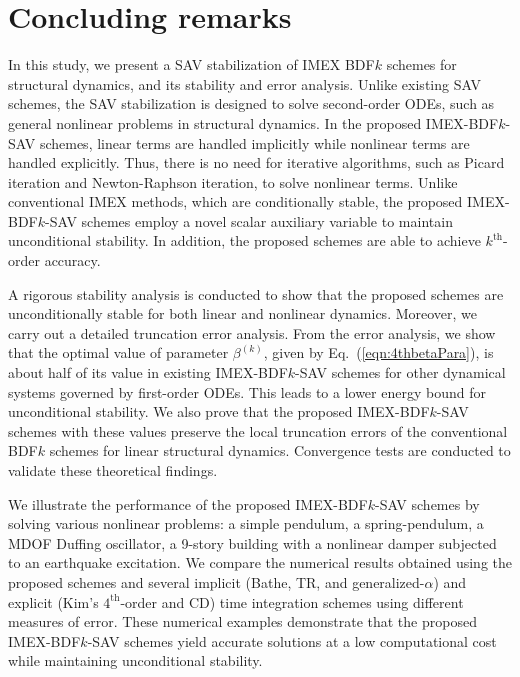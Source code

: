 \documentclass[review]{elsarticle}
\begin{document}
\section{Concluding remarks}
\label{sec:4th4}
In this study, we present a SAV stabilization of IMEX BDF$k$ schemes for structural dynamics, and its stability and error analysis.
Unlike existing SAV schemes, the SAV stabilization is designed to solve second-order ODEs, such as general nonlinear problems in structural dynamics.
In the proposed IMEX-BDF$k$-SAV schemes, linear terms are handled implicitly while nonlinear terms are handled explicitly.
Thus, there is no need for iterative algorithms, such as Picard iteration and Newton-Raphson iteration, to solve nonlinear terms. 
Unlike conventional IMEX methods, which are conditionally stable, the proposed IMEX-BDF$k$-SAV schemes employ a novel scalar auxiliary variable to maintain unconditional stability.
In addition, the proposed schemes are able to achieve $k^{\textrm{th}}$-order accuracy.

A rigorous stability analysis is conducted to show that the proposed schemes are unconditionally stable for both linear and nonlinear dynamics.
Moreover, we carry out a detailed truncation error analysis.
From the error analysis, we show that the optimal value of parameter $\beta^{(k)}$, given by Eq.~(\ref{eqn:4thbetaPara}), is about half of its value in existing IMEX-BDF$k$-SAV schemes for other dynamical systems governed by first-order ODEs.
This leads to a lower energy bound for unconditional stability.
We also prove that the proposed IMEX-BDF$k$-SAV schemes with these values preserve the local truncation errors of the conventional BDF$k$ schemes for linear structural dynamics.
Convergence tests are conducted to validate these theoretical findings.

We illustrate the performance of the proposed IMEX-BDF$k$-SAV schemes by solving various nonlinear problems: a simple pendulum, a spring-pendulum, a MDOF Duffing oscillator, a 9-story building with a nonlinear damper subjected to an earthquake excitation.
We compare the numerical results obtained using the proposed schemes and several implicit (Bathe, TR, and generalized-$\alpha$) and explicit (Kim's $4^{\textrm{th}}$-order and CD) time integration schemes using different measures of error.
These numerical examples demonstrate that the proposed IMEX-BDF$k$-SAV schemes yield accurate solutions at a low computational cost while maintaining unconditional stability.
\end{document}

